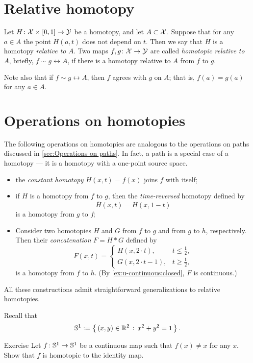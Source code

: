 \section{Relative homotopy}\label{sec:rel-homotopy}

Let $H\colon\mathcal{X}\times[0,1]\to \mathcal{Y}$ be a homotopy, and let $A\subset \mathcal{X}$.
Suppose that for any $a\in A$ the point $H(a,t)$ does not depend on $t$.
Then we say that $H$ is a homotopy \emph{relative to $A$}.
Two maps $f,g\colon \mathcal{X}\to \mathcal{Y}$ are called {}\emph{homotopic relative to $A$}, briefly, $f\sim g\rel A$, if there is a homotopy relative to $A$ from $f$ to $g$.

Note also that if $f\sim g\rel A$, then $f$ agrees with $g$ on $A$;
that is, $f(a)=g(a)$ for any $a\in A$.

\section{Operations on homotopies}\label{sec:homot-operations}

The following operations on homotopies are analogous to the operations on paths discussed in \ref{sec:Operations on paths}.
In fact, a path is a special case of a homotopy --- it is a homotopy with a one-point source space.
\begin{itemize}
\item the \emph{constant homotopy} $H(x,t)=f(x)$ joins $f$ with itself;
\item if $H$ is a homotopy from $f$ to $g$, then the
\emph{time-reversed} homotopy defined by
\[
\bar H(x,t)=H(x,1-t)
\]
is a homotopy from $g$ to $f$;
\item Consider two homotopies $H$ and $G$ from $f$ to $g$ and from $g$ to $h$, respectively.
Then their \emph{concatenation} $F=H*G$ defined by
\[
F(x,t)=
\begin{cases}
H(x,2\cdot t),& t\le \tfrac12,\\
G(x,2\cdot t-1),& t\ge \tfrac12,
\end{cases}
\]
is a homotopy from $f$ to $h$.
(By \ref{ex:u-continuous:closed}, $F$ is continuous.)
\end{itemize}

All these constructions admit straightforward generalizations to relative homotopies.

Recall that
\[\mathbb{S}^1\mathrel{:=}\left\{\,{(x,y)\in\mathbb{R}^2}\,:\,{x^2+y^2=1}\,\right\}.\]

\begin{thm}{Exercise}\label{ex:homot-S1}
Let $f\:\SS^1\z\to\SS^1$ be a continuous map such that
$f(x)\ne x$ for any $x$.
Show that $f$ is homotopic to the identity map.
\end{thm}

